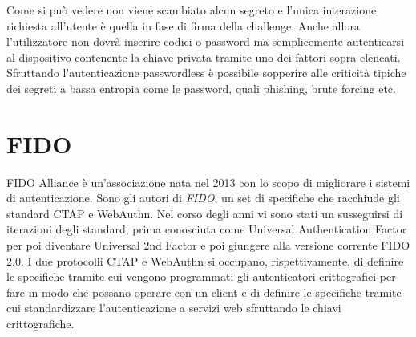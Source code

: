 Come si può vedere non viene scambiato alcun segreto e l'unica interazione richiesta all'utente è quella in fase di firma della challenge. Anche allora l'utilizzatore non dovrà inserire codici o password ma semplicemente autenticarsi al dispositivo contenente la chiave privata tramite uno dei fattori sopra elencati. Sfruttando l'autenticazione passwordless è possibile sopperire alle criticità tipiche dei segreti a bassa entropia come le password, quali phishing, brute forcing etc. 

\section{FIDO}
\label{fido}

FIDO Alliance è un'associazione nata nel 2013 con lo scopo di migliorare i sistemi di autenticazione. Sono gli autori di \emph{FIDO}, un set di specifiche che racchiude gli standard CTAP e WebAuthn. Nel corso degli anni vi sono stati un susseguirsi di iterazioni degli standard, prima conosciuta come Universal Authentication Factor per poi diventare Universal 2nd Factor e poi giungere alla versione corrente FIDO 2.0. I due protocolli CTAP e WebAuthn si occupano, rispettivamente, di definire le specifiche tramite cui vengono programmati gli autenticatori crittografici per fare in modo che possano operare con un client e di definire le specifiche tramite cui standardizzare l'autenticazione a servizi web sfruttando le chiavi crittografiche. 